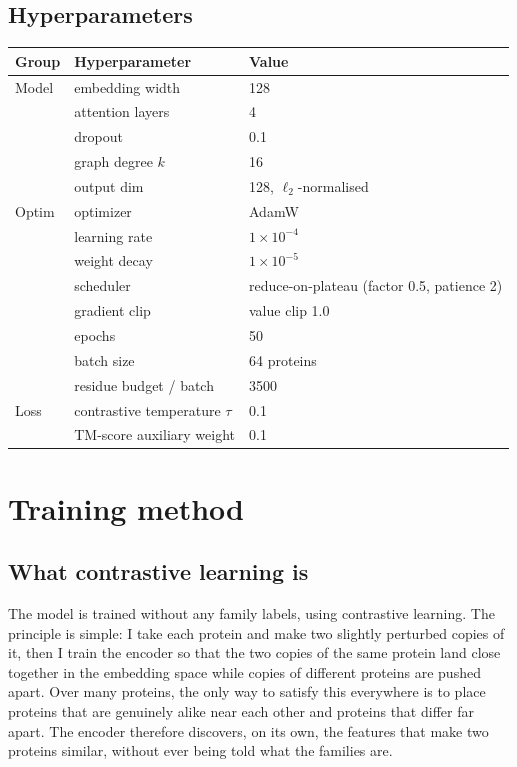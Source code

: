 \documentclass[11pt,a4paper]{article}
\theoremstyle{definition}
\begin{document}
\subsection{Hyperparameters}

\begin{center}
\begin{tabular}{@{}l l l@{}}
\toprule
Group & Hyperparameter & Value\\
\midrule
Model & embedding width        & 128\\
      & attention layers       & 4\\
      & dropout                & 0.1\\
      & graph degree $k$       & 16\\
      & output dim             & 128, $\ell_2$-normalised\\
\midrule
Optim & optimizer              & AdamW\\
      & learning rate          & $1\times10^{-4}$\\
      & weight decay           & $1\times10^{-5}$\\
      & scheduler              & reduce-on-plateau (factor 0.5, patience 2)\\
      & gradient clip          & value clip 1.0\\
      & epochs                 & 50\\
      & batch size             & 64 proteins\\
      & residue budget / batch & 3500\\
\midrule
Loss  & contrastive temperature $\tau$ & 0.1\\
      & TM-score auxiliary weight       & 0.1\\
\bottomrule
\end{tabular}
\end{center}

\section{Training method}

\subsection{What contrastive learning is}

The model is trained without any family labels, using contrastive learning. The
principle is simple: I take each protein and make two slightly perturbed copies of
it, then I train the encoder so that the two copies of the same protein land close
together in the embedding space while copies of different proteins are pushed
apart. Over many proteins, the only way to satisfy this everywhere is to place
proteins that are genuinely alike near each other and proteins that differ far
apart. The encoder therefore discovers, on its own, the features that make two
proteins similar, without ever being told what the families are.
\end{document}
